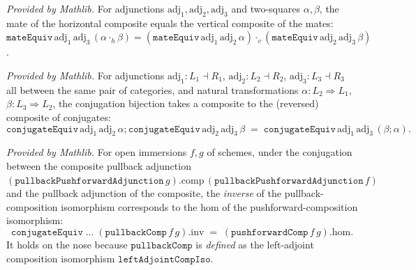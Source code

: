 \begin{lemma}
  \label{lem:mateequiv_vcomp}
  \mathlibok
  \textit{Provided by Mathlib.}
  For adjunctions \(\mathrm{adj}_1, \mathrm{adj}_2, \mathrm{adj}_3\) and two-squares \(\alpha,
  \beta\), the mate of the horizontal composite equals the vertical composite of the mates:
  \(\mathtt{mateEquiv}\,\mathrm{adj}_1\,\mathrm{adj}_3\,(\alpha \cdot_h \beta)
    = (\mathtt{mateEquiv}\,\mathrm{adj}_1\,\mathrm{adj}_2\,\alpha)
      \cdot_v (\mathtt{mateEquiv}\,\mathrm{adj}_2\,\mathrm{adj}_3\,\beta)\).
\end{lemma}

\begin{lemma}
  \label{lem:conjugateequiv_comp}
  \mathlibok
  \textit{Provided by Mathlib.}
  For adjunctions \(\mathrm{adj}_1 : L_1 \dashv R_1\), \(\mathrm{adj}_2 : L_2 \dashv R_2\),
  \(\mathrm{adj}_3 : L_3 \dashv R_3\) all between the same pair of categories, and natural
  transformations \(\alpha : L_2 \Rightarrow L_1\), \(\beta : L_3 \Rightarrow L_2\), the conjugation
  bijection takes a composite to the (reversed) composite of conjugates:
  \[
    \mathtt{conjugateEquiv}\,\mathrm{adj}_1\,\mathrm{adj}_2\,\alpha
      \mathbin{;} \mathtt{conjugateEquiv}\,\mathrm{adj}_2\,\mathrm{adj}_3\,\beta
      \;=\; \mathtt{conjugateEquiv}\,\mathrm{adj}_1\,\mathrm{adj}_3\,(\beta \mathbin{;} \alpha).
  \]
\end{lemma}

\begin{lemma}
  \label{lem:conjugate_equiv_pullbackcomp_inv}
  \mathlibok
  \textit{Provided by Mathlib.}
  For open immersions \(f, g\) of schemes, under the conjugation between the composite pullback
  adjunction \((\mathtt{pullbackPushforwardAdjunction}\,g).\mathrm{comp}\,
  (\mathtt{pullbackPushforwardAdjunction}\,f)\) and the pullback adjunction of the composite, the
  \emph{inverse} of the pullback-composition isomorphism corresponds to the hom of the
  pushforward-composition isomorphism:
  \[
    \mathtt{conjugateEquiv}\;\dots\;(\mathtt{pullbackComp}\,f\,g).\mathrm{inv}
      \;=\; (\mathtt{pushforwardComp}\,f\,g).\mathrm{hom}.
  \]
  It holds on the nose because \(\mathtt{pullbackComp}\) is \emph{defined} as the left-adjoint
  composition isomorphism \(\mathtt{leftAdjointCompIso}\).
\end{lemma}

